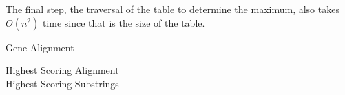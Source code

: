 \documentclass[12pt,twoside]{article}
\begin{document}
\begin{problems}
\begin{problemparts}
The final step, the traversal of the table to determine the maximum, also takes $O(n^2)$ time since that is the size of the table.\\
\end{problemparts}
\problem Gene Alignment
\begin{problemparts}
\problempart Highest Scoring Alignment\\
\problempart Highest Scoring Substrings\\
\end{problemparts}
\end{problems}
\end{document}
